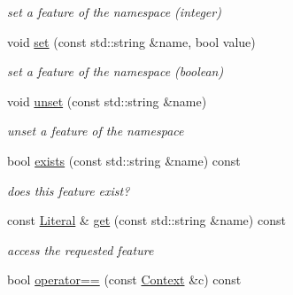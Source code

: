 \begin{DoxyCompactItemize}
\begin{DoxyCompactList}\small\item\em set a feature of the namespace (integer) \end{DoxyCompactList}\item 
\hypertarget{classcfg_1_1Context_a3dbae42248afdcc80c10cccf79f7ed88}{void \hyperlink{classcfg_1_1Context_a3dbae42248afdcc80c10cccf79f7ed88}{set} (const std\-::string \&name, bool value)}\label{classcfg_1_1Context_a3dbae42248afdcc80c10cccf79f7ed88}

\begin{DoxyCompactList}\small\item\em set a feature of the namespace (boolean) \end{DoxyCompactList}\item 
\hypertarget{classcfg_1_1Context_a4d183ca165e439f5f37c1ef8ac9f4aec}{void \hyperlink{classcfg_1_1Context_a4d183ca165e439f5f37c1ef8ac9f4aec}{unset} (const std\-::string \&name)}\label{classcfg_1_1Context_a4d183ca165e439f5f37c1ef8ac9f4aec}

\begin{DoxyCompactList}\small\item\em unset a feature of the namespace \end{DoxyCompactList}\item 
\hypertarget{classcfg_1_1Context_aee81f27c123da4e0dac4de50e68df4fe}{bool \hyperlink{classcfg_1_1Context_aee81f27c123da4e0dac4de50e68df4fe}{exists} (const std\-::string \&name) const }\label{classcfg_1_1Context_aee81f27c123da4e0dac4de50e68df4fe}

\begin{DoxyCompactList}\small\item\em does this feature exist? \end{DoxyCompactList}\item 
\hypertarget{classcfg_1_1Context_a603fe12c0b04a99aa59c6c2bc17b6152}{const \hyperlink{classcfg_1_1Literal}{Literal} \& \hyperlink{classcfg_1_1Context_a603fe12c0b04a99aa59c6c2bc17b6152}{get} (const std\-::string \&name) const }\label{classcfg_1_1Context_a603fe12c0b04a99aa59c6c2bc17b6152}

\begin{DoxyCompactList}\small\item\em access the requested feature \end{DoxyCompactList}\item 
\hypertarget{classcfg_1_1Context_adaf70b7fb48272eed2f9a0cb2006a483}{bool \hyperlink{classcfg_1_1Context_adaf70b7fb48272eed2f9a0cb2006a483}{operator==} (const \hyperlink{classcfg_1_1Context}{Context} \&c) const }\label{classcfg_1_1Context_adaf70b7fb48272eed2f9a0cb2006a483}


\end{DoxyCompactItemize}
